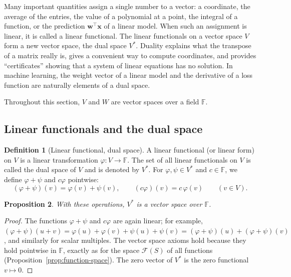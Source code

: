 \documentclass[11pt]{article}
\theoremstyle{definition}
\newtheorem{definition}{Definition}[section]
\theoremstyle{plain}
\newtheorem{proposition}[definition]{Proposition}
\theoremstyle{remark}
\begin{document}
Many important quantities assign a single number to a vector: a coordinate, the average of the entries, the value of a polynomial at a point, the integral of a function, or the prediction $\mathbf{w}^\top \mathbf{x}$ of a linear model. When such an assignment is linear, it is called a linear functional. The linear functionals on a vector space $V$ form a new vector space, the dual space $V^*$. Duality explains what the transpose of a matrix really is, gives a convenient way to compute coordinates, and provides ``certificates'' showing that a system of linear equations has no solution. In machine learning, the weight vector of a linear model and the derivative of a loss function are naturally elements of a dual space.

Throughout this section, $V$ and $W$ are vector spaces over a field $\mathbb{F}$.

\subsection{Linear functionals and the dual space}

\begin{definition}[Linear functional, dual space]\label{def:dual}
    A linear functional (or linear form) on $V$ is a linear transformation $\varphi: V \to \mathbb{F}$. The set of all linear functionals on $V$ is called the dual space of $V$ and is denoted by $V^*$. For $\varphi, \psi \in V^*$ and $c \in \mathbb{F}$, we define $\varphi + \psi$ and $c\varphi$ pointwise:
    \[(\varphi + \psi)(v) = \varphi(v) + \psi(v), \qquad (c\varphi)(v) = c\, \varphi(v) \qquad (v \in V).\]
\end{definition}

\begin{proposition}
    With these operations, $V^*$ is a vector space over $\mathbb{F}$.
\end{proposition}

\begin{proof}
    The functions $\varphi + \psi$ and $c\varphi$ are again linear; for example, $(\varphi + \psi)(u + v) = \varphi(u) + \varphi(v) + \psi(u) + \psi(v) = (\varphi + \psi)(u) + (\varphi + \psi)(v)$, and similarly for scalar multiples. The vector space axioms hold because they hold pointwise in $\mathbb{F}$, exactly as for the space $\mathcal{F}(S)$ of all functions (Proposition~\ref{prop:function-space}). The zero vector of $V^*$ is the zero functional $v \mapsto 0$.
\end{proof}
\end{document}
